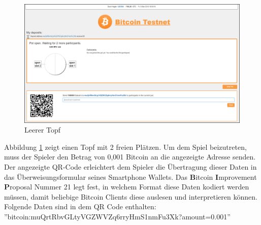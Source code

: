 \begin{figure}[H]
\centering
\includegraphics[width=1\linewidth]{Figures/btc_gui/pot_open_empty}
\decoRule
\caption{Leerer Topf}
\label{fig:pot_open_empty}
\end{figure}
Abbildung \ref{fig:pot_open_empty} zeigt einen Topf mit 2 freien Plätzen. Um dem Spiel beizutreten, muss der Spieler den Betrag von 0,001 Bitcoin an die angezeigte Adresse senden. Der angezeigte QR-Code erleichtert dem Spieler die Übertragung dieser Daten in das Überweisungsformular seines Smartphone Wallets. Das \textbf{B}itcoin \textbf{I}mprovement \textbf{P}roposal Nummer 21\citep{bip21}  legt fest, in welchem Format diese Daten kodiert werden müssen, damit beliebige Bitcoin Clients diese auslesen und interpretieren können. 
Folgende Daten sind in dem QR Code enthalten:\\ ''bitcoin:muQrtRbvGLtyVGZWVZq6rryHmS1nmFu3Xk?amount=0.001''

